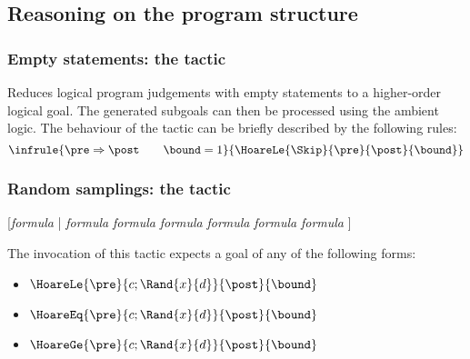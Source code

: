 

\subsection{Reasoning on the program structure}
\subsubsection*{Empty statements: the  tactic}

\Syntax {}

\Description Reduces logical program judgements with empty statements
to a higher-order logical goal. The generated subgoals can then be
processed using the ambient logic. The behaviour of the 
tactic can be briefly described by the following rules:
%
\begin{displaymath}
\infrule{
  \pre \Rightarrow \post \qquad \bound = 1
}{
  \HoareLe{\Skip}{\pre}{\post}{\bound}
}
\end{displaymath}
%


\subsubsection*{Random samplings: the  tactic}

\Syntax 
{} [\textit{formula} | \textit{formula} \textit{formula}
\textit{formula} \textit{formula} \textit{formula} \textit{formula} ] 

\Description

The invocation of this tactic expects a goal of any of the following
forms:
\begin{itemize}
\item $\HoareLe{\pre}{c;\Rand{x}{d}}{\post}{\bound}$
\item $\HoareEq{\pre}{c;\Rand{x}{d}}{\post}{\bound}$
\item $\HoareGe{\pre}{c;\Rand{x}{d}}{\post}{\bound}$
\end{itemize}

